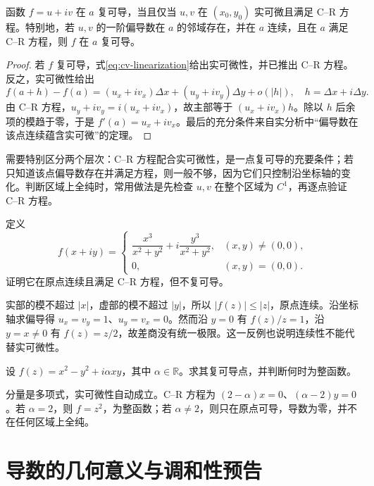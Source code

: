 \documentclass[UTF8,12pt,a4paper,fontset=fandol]{ctexbook}
\begin{document}
\begin{theorem}[复可导的实微分判别]
\label{thm:cv-cr}
函数 $f=u+iv$ 在 $a$ 复可导，当且仅当 $u,v$ 在 $(x_0,y_0)$ 实可微且满足 C--R 方程。特别地，若 $u,v$ 的一阶偏导数在 $a$ 的邻域存在，并在 $a$ 连续，且在 $a$ 满足 C--R 方程，则 $f$ 在 $a$ 复可导。
\end{theorem}
\begin{proof}
若 $f$ 复可导，式\eqref{eq:cv-linearization}给出实可微性，并已推出 C--R 方程。反之，实可微性给出
\[
 f(a+h)-f(a)
 =(u_x+iv_x)\Delta x+(u_y+iv_y)\Delta y+o(|h|),
 \quad h=\Delta x+i\Delta y.
\]
由 C--R 方程，$u_y+iv_y=i(u_x+iv_x)$，故主部等于 $(u_x+iv_x)h$。除以 $h$ 后余项的模趋于零，于是 $f'(a)=u_x+iv_x$。最后的充分条件来自实分析中“偏导数在该点连续蕴含实可微”的定理。
\end{proof}

需要特别区分两个层次：C--R 方程配合实可微性，是一点复可导的充要条件；若只知道该点偏导数存在并满足方程，则一般不够，因为它们只控制沿坐标轴的变化。判断区域上全纯时，常用做法是先检查 $u,v$ 在整个区域为 $C^1$，再逐点验证 C--R 方程。

\begin{example}[只验证偏导数为什么不够]
定义
\[
 f(x+iy)=
 \begin{cases}
 \dfrac{x^3}{x^2+y^2}+i\dfrac{y^3}{x^2+y^2},&(x,y)\ne(0,0),\\
 0,&(x,y)=(0,0).
 \end{cases}
\]
证明它在原点连续且满足 C--R 方程，但不复可导。
\end{example}
\begin{solve}
实部的模不超过 $|x|$，虚部的模不超过 $|y|$，所以 $|f(z)|\le|z|$，原点连续。沿坐标轴求偏导得 $u_x=v_y=1$、$u_y=v_x=0$。然而沿 $y=0$ 有 $f(z)/z=1$，沿 $y=x\ne0$ 有 $f(z)=z/2$，故差商没有统一极限。这一反例也说明连续性不能代替实可微性。
\end{solve}

\begin{example}[判断一个函数在哪里全纯]
设 $f(z)=x^2-y^2+i\alpha xy$，其中 $\alpha\in\mathbb R$。求其复可导点，并判断何时为整函数。
\end{example}
\begin{solve}
分量是多项式，实可微性自动成立。C--R 方程为 $(2-\alpha)x=0$、$(\alpha-2)y=0$。若 $\alpha=2$，则 $f=z^2$，为整函数；若 $\alpha\ne2$，则只在原点可导，导数为零，并不在任何区域上全纯。
\end{solve}

\section{导数的几何意义与调和性预告}
\end{document}
